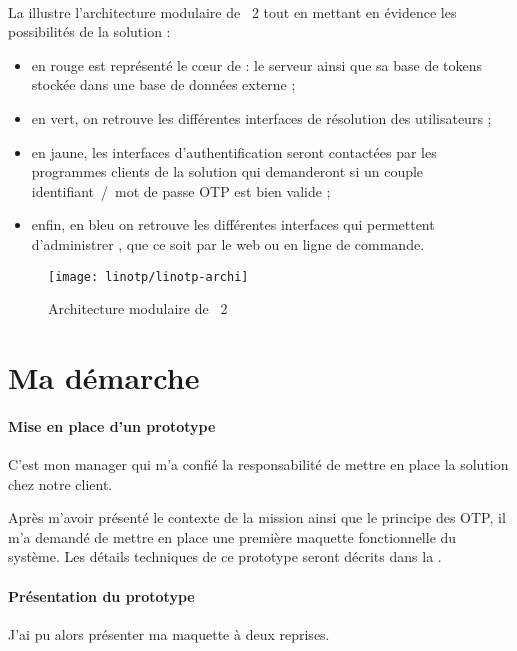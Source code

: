 \paragraph{}
La  illustre l'architecture modulaire de \alinotp{}~2 tout en mettant en évidence les possibilités de la solution :

\begin{itemize}
	\item en rouge est représenté le c\oe ur de \alinotp{} : le serveur ainsi que sa base de tokens stockée dans une base de données externe ;
	\item en vert, on retrouve les différentes interfaces de résolution des utilisateurs ;
	\item en jaune, les interfaces d'authentification seront contactées par les pro\-gram\-mes clients de la solution qui demanderont si un couple identifiant~/~mot de passe OTP est bien valide ;
	\item enfin, en bleu on retrouve les différentes interfaces qui permettent d'administrer \alinotp{}, que ce soit par le web ou en ligne de commande.
\end{itemize}

\begin{figure}
	\centering
	\texttt{[image: linotp/linotp-archi]}
	\caption{Architecture modulaire de \alinotp{}~2}
	\label{figure:linotp:linotp-archi}
\end{figure}


\section{Ma démarche}

\paragraph{Mise en place d'un prototype}
C'est mon manager \apakou{} qui m'a confié la responsabilité de mettre en place la solution \alinotp{} chez notre client.

Après m'avoir présenté le contexte de la mission ainsi que le principe des OTP, il m'a demandé de mettre en place une première maquette fonctionnelle du système.
Les détails techniques de ce prototype seront décrits dans la .

\paragraph{Présentation du prototype}
J'ai pu alors présenter ma maquette à deux reprises.

